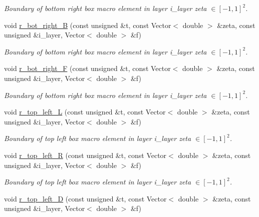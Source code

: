 \begin{DoxyCompactItemize}
\begin{DoxyCompactList}\small\item\em Boundary of bottom right box macro element in layer i\+\_\+layer zeta $ \in [-1,1]^2 $. \end{DoxyCompactList}\item 
void \hyperlink{classoomph_1_1QuarterTubeDomain_aef8a75f0a0790e2a43f2702524a48e60}{r\+\_\+bot\+\_\+right\+\_\+B} (const unsigned \&t, const Vector$<$ double $>$ \&zeta, const unsigned \&i\+\_\+layer, Vector$<$ double $>$ \&f)
\begin{DoxyCompactList}\small\item\em Boundary of bottom right box macro element in layer i\+\_\+layer zeta $ \in [-1,1]^2 $. \end{DoxyCompactList}\item 
void \hyperlink{classoomph_1_1QuarterTubeDomain_a7d71f1ff7b0ea3a9bdbf68b6248a60fe}{r\+\_\+bot\+\_\+right\+\_\+F} (const unsigned \&t, const Vector$<$ double $>$ \&zeta, const unsigned \&i\+\_\+layer, Vector$<$ double $>$ \&f)
\begin{DoxyCompactList}\small\item\em Boundary of bottom right box macro element in layer i\+\_\+layer zeta $ \in [-1,1]^2 $. \end{DoxyCompactList}\item 
void \hyperlink{classoomph_1_1QuarterTubeDomain_a17a846a90e283ec86538f17145ad7923}{r\+\_\+top\+\_\+left\+\_\+L} (const unsigned \&t, const Vector$<$ double $>$ \&zeta, const unsigned \&i\+\_\+layer, Vector$<$ double $>$ \&f)
\begin{DoxyCompactList}\small\item\em Boundary of top left box macro element in layer i\+\_\+layer zeta $ \in [-1,1]^2 $. \end{DoxyCompactList}\item 
void \hyperlink{classoomph_1_1QuarterTubeDomain_a1aded600b61798fbc080189fadd1c603}{r\+\_\+top\+\_\+left\+\_\+R} (const unsigned \&t, const Vector$<$ double $>$ \&zeta, const unsigned \&i\+\_\+layer, Vector$<$ double $>$ \&f)
\begin{DoxyCompactList}\small\item\em Boundary of top left box macro element in layer i\+\_\+layer zeta $ \in [-1,1]^2 $. \end{DoxyCompactList}\item 
void \hyperlink{classoomph_1_1QuarterTubeDomain_a07e5e6c5549b5cda5adbc91c8c9fdcbb}{r\+\_\+top\+\_\+left\+\_\+D} (const unsigned \&t, const Vector$<$ double $>$ \&zeta, const unsigned \&i\+\_\+layer, Vector$<$ double $>$ \&f)

\end{DoxyCompactItemize}
